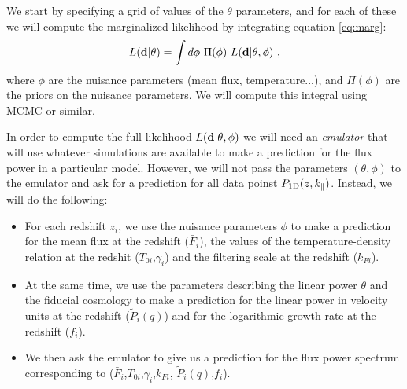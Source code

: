 We start by specifying a grid of values of the $\theta$ parameters, and for
each of these we will compute the marginalized likelihood by integrating
equation \ref{eq:marg}:
\begin{equation} 
 L(\mathbf{d} | \theta)
  = \int d\phi ~ \Pi(\phi) ~ L(\mathbf{d} | \theta, \phi) ~,
\end{equation}
where $\phi$ are the nuisance parameters (mean flux, temperature...), and 
$\Pi(\phi)$ are the priors on the nuisance parameters.
We will compute this integral using MCMC or similar. 


In order to compute the full likelihood $L(\mathbf{d} | \theta, \phi)$ we will
need an \textit{emulator} that will use whatever simulations are available
to make a prediction for the flux power in a particular model.
However, we will not pass the parameters $(\theta,\phi)$ to the emulator
and ask for a prediction for all data poinst $P_{\rm 1D}(z,k_\parallel)$.
Instead, we will do the following:
\begin{itemize}
 \item For each redshift $z_i$, we use the nuisance parameters $\phi$ to
  make a prediction for the mean flux at the redshift ($\bar F_i$), the
  values of the temperature-density relation at the redshit 
  ($T_{0i}$,$\gamma_i$) and the filtering scale at the redshift ($k_{Fi}$).
 \item At the same time, we use the parameters describing the linear power
  $\theta$ and the fiducial cosmology to make a prediction for the linear
  power in velocity units at the redshift ($\tilde P_i(q)$) and for the
  logarithmic growth rate at the redshift ($f_i$).
 \item We then ask the emulator to give us a prediction for the flux power
  spectrum corresponding to ($\bar F_i$,$T_{0i}$,$\gamma_i$,$k_{Fi}$,
  $\tilde P_i(q)$,$f_i$).
\end{itemize}


